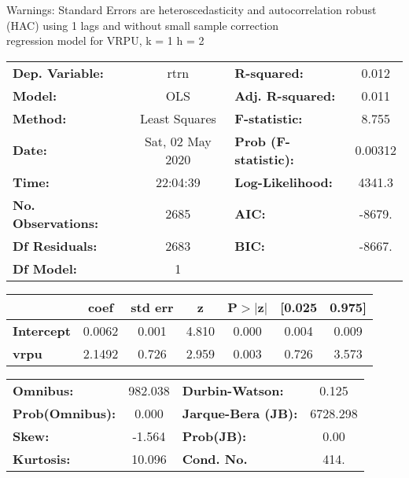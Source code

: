 Warnings: \newline
 [1] Standard Errors are heteroscedasticity and autocorrelation robust (HAC) using 1 lags and without small sample correction\\ 

regression model for VRPU, k = 1 h = 2\begin{center}
\begin{tabular}{lclc}
\toprule
\textbf{Dep. Variable:}    &       rtrn       & \textbf{  R-squared:         } &     0.012   \\
\textbf{Model:}            &       OLS        & \textbf{  Adj. R-squared:    } &     0.011   \\
\textbf{Method:}           &  Least Squares   & \textbf{  F-statistic:       } &     8.755   \\
\textbf{Date:}             & Sat, 02 May 2020 & \textbf{  Prob (F-statistic):} &  0.00312    \\
\textbf{Time:}             &     22:04:39     & \textbf{  Log-Likelihood:    } &    4341.3   \\
\textbf{No. Observations:} &        2685      & \textbf{  AIC:               } &    -8679.   \\
\textbf{Df Residuals:}     &        2683      & \textbf{  BIC:               } &    -8667.   \\
\textbf{Df Model:}         &           1      & \textbf{                     } &             \\
\bottomrule
\end{tabular}
\begin{tabular}{lcccccc}
                   & \textbf{coef} & \textbf{std err} & \textbf{z} & \textbf{P$> |$z$|$} & \textbf{[0.025} & \textbf{0.975]}  \\
\midrule
\textbf{Intercept} &       0.0062  &        0.001     &     4.810  &         0.000        &        0.004    &        0.009     \\
\textbf{vrpu}      &       2.1492  &        0.726     &     2.959  &         0.003        &        0.726    &        3.573     \\
\bottomrule
\end{tabular}
\begin{tabular}{lclc}
\textbf{Omnibus:}       & 982.038 & \textbf{  Durbin-Watson:     } &    0.125  \\
\textbf{Prob(Omnibus):} &   0.000 & \textbf{  Jarque-Bera (JB):  } & 6728.298  \\
\textbf{Skew:}          &  -1.564 & \textbf{  Prob(JB):          } &     0.00  \\
\textbf{Kurtosis:}      &  10.096 & \textbf{  Cond. No.          } &     414.  \\
\bottomrule
\end{tabular}
\end{center}

